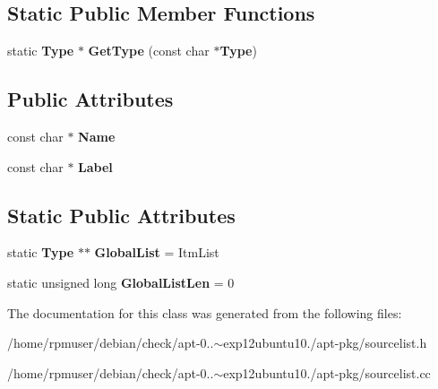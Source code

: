 \subsection*{\-Static \-Public \-Member \-Functions}
\begin{DoxyCompactItemize}
\item 
static {\bf \-Type} $\ast$ {\bfseries \-Get\-Type} (const char $\ast${\bf \-Type})\label{classpkgSourceList_1_1Type_a585f51a9eee88b69baeecffd95d4d71d}

\end{DoxyCompactItemize}
\subsection*{\-Public \-Attributes}
\begin{DoxyCompactItemize}
\item 
const char $\ast$ {\bfseries \-Name}\label{classpkgSourceList_1_1Type_a760b4e07b204e4852e7fb55e25567623}

\item 
const char $\ast$ {\bfseries \-Label}\label{classpkgSourceList_1_1Type_a2c28600dbc88e9535c6e44b111829cc2}

\end{DoxyCompactItemize}
\subsection*{\-Static \-Public \-Attributes}
\begin{DoxyCompactItemize}
\item 
static {\bf \-Type} $\ast$$\ast$ {\bfseries \-Global\-List} = \-Itm\-List\label{classpkgSourceList_1_1Type_a4f7b5b7cf66e2b414699eea2894719a9}

\item 
static unsigned long {\bfseries \-Global\-List\-Len} = 0\label{classpkgSourceList_1_1Type_acdd1750df964c2a94afe622abfe15d7b}

\end{DoxyCompactItemize}


\-The documentation for this class was generated from the following files\-:\begin{DoxyCompactItemize}
\item 
/home/rpmuser/debian/check/apt-\/0..$\sim$exp12ubuntu10./apt-\/pkg/sourcelist.\-h\item 
/home/rpmuser/debian/check/apt-\/0..$\sim$exp12ubuntu10./apt-\/pkg/sourcelist.\-cc\end{DoxyCompactItemize}

